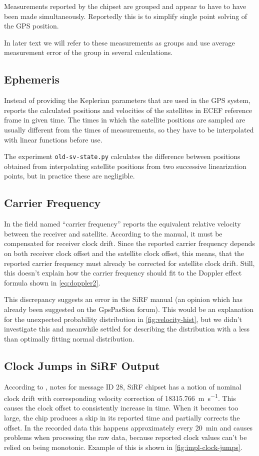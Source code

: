 Measurements reported by the chipset are grouped and appear
to have to have been made simultaneously.
Reportedly this is to simplify single point solving of the GPS position.

In later text we will refer to these measurements as groups and use average
measurement error of the group in several calculations.

\subsection{Ephemeris}
\label{sec:impl-sirf-ephemeris}
Instead of providing the Keplerian parameters that are used in the GPS system,
\sirf reports the calculated positions and velocities of the satellites in ECEF
reference frame in given time.
The times in which the satellite positions are sampled are usually different
from the times of measurements, so they have to be interpolated with linear functions
before use.

The experiment \verb=old-sv-state.py= calculates the difference between positions
obtained from interpolating satellite positions from two successive linearization points, but in
practice these are negligible.

\subsection{Carrier Frequency}
\label{sec:impl-carrier-freq}
In the field named \enquote{carrier frequency} \sirf reports the equivalent relative velocity
between the receiver and satellite.
According to the manual, it must be compensated for receiver clock drift.
Since the reported carrier frequency depends on both receiver clock offset and 
the satellite clock offset, this means, that the reported carrier frequency must already
be corrected for satellite clock drift.
Still, this doesn't explain how the carrier frequency should fit to the Doppler
effect formula shown in \cref{eq:doppler2}.

This discrepancy suggests an error in the SiRF manual (an opinion which has already been
suggested on the GpsPasSion forum).
This would be an explanation for the unexpected probability distribution in
\cref{fig:velocity-hist}, but we didn't investigate this and meanwhile
settled for describing the distribution with a less than optimally fitting normal distribution.

\subsection{Clock Jumps in SiRF Output}
\label{sec:impl-sirf-jumps}
According to \cite{sirf-protocol}, notes for message ID 28, SiRF chipset has a
notion of nominal clock drift with corresponding velocity correction of \SI{18315.766}{\meter\per\second}.
This causes the clock offset to consistently increase in time.
When it becomes too large, the chip produces a skip in its reported time and
partially corrects the offset.
In the recorded data this happens approximately every \SI{20}{\minute} and causes
problems when processing the raw data, because reported clock values
can't be relied on being monotonic.
Example of this is shown in \cref{fig:impl-clock-jumps}.

